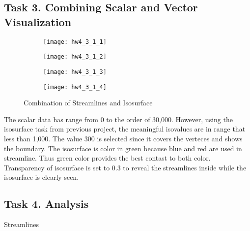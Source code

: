 \documentclass[11pt]{article}
\begin{document}

\subsection*{Task 3. Combining Scalar and Vector Visualization}

\begin{figure}[H]
\begin{subfigure}{.5\textwidth}
  \centering
  \texttt{[image: hw4\_3\_1\_1]}
  \caption{}
  \label{fig:hw4_3_1_1}
\end{subfigure}
\begin{subfigure}{.5\textwidth}
  \centering
  \texttt{[image: hw4\_3\_1\_2]}
  \caption{}
  \label{fig:hw4_3_1_2}
\end{subfigure}

\begin{subfigure}{.5\textwidth}
  \centering
  \texttt{[image: hw4\_3\_1\_3]}
  \caption{}
  \label{fig:hw4_3_1_3}
\end{subfigure}
\begin{subfigure}{.5\textwidth}
  \centering
  \texttt{[image: hw4\_3\_1\_4]}
  \caption{}
  \label{fig:hw4_3_1_4}
\end{subfigure}
\caption{Combination of Streamlines and Isosurface}
\label{fig:hw4_3_1}
\end{figure}

The scalar data has range from 0 to the order of 30,000. However, using the isosurface task from  previous  project, the meaningful isovalues are in range that less than 1,000. The value 300 is selected since it covers the verteces and shows the boundary. 
The isosurface is color in green because blue and red are used in streamline. Thus green color provides the best contast to both color.
Transparency of isosurface is set to 0.3 to reveal the streamlines inside while the isosurface is clearly seen.


\subsection*{Task 4. Analysis}

Streamlines
\end{document}
